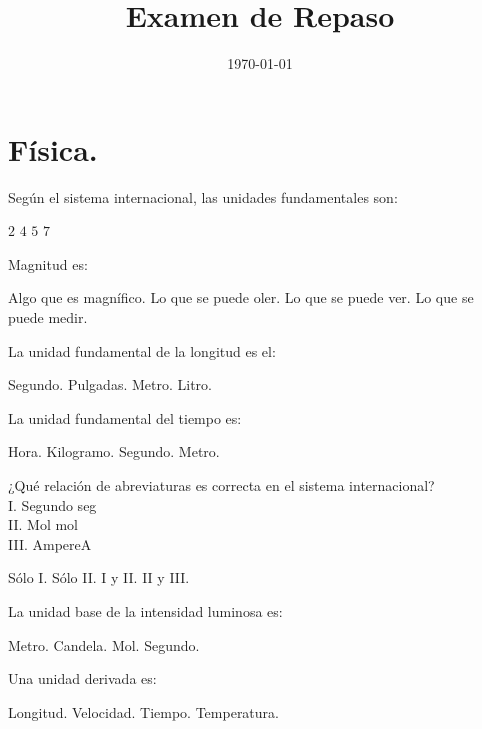 \documentclass[12pt]{exam}
\title{\vspace*{-2cm}Examen de Repaso\vspace{-5ex}}
\date{\today}
\begin{document}
\maketitle

\section{Física.}

\begin{questions}
    \question Según el sistema internacional, las unidades fundamentales son:
    \\[0.5em]
    \begin{oneparchoices}
        \choice $2$
        \choice $4$
        \choice $5$
        \choice $7$
    \end{oneparchoices}
    \question Magnitud es:
    \begin{choices}
        \choice Algo que es magnífico.
        \choice Lo que se puede oler.
        \choice Lo que se puede ver.
        \choice Lo que se puede medir.
    \end{choices}
    \question La unidad fundamental de la longitud es el:
    \\[0.5em]
    \begin{oneparchoices}
        \choice Segundo.
        \choice Pulgadas.
        \choice Metro.
        \choice Litro.
    \end{oneparchoices}
    \question La unidad fundamental del tiempo es:
    \\[0.5em]
    \begin{oneparchoices}
        \choice Hora.
        \choice Kilogramo.
        \choice Segundo.        
        \choice Metro.
    \end{oneparchoices}
    \question ¿Qué relación de abreviaturas es correcta en el sistema internacional?
    \\[0.5em]
    I. \quad Segundo \quad seg \\
    II. \quad Mol \quad mol \\
    III. \quad Ampere\quad A 
    \\[0.5em]
    \begin{oneparchoices}
        \choice Sólo I.
        \choice Sólo II.
        \choice I y II.
        \choice II y III.    
    \end{oneparchoices}
    \question La unidad base de la intensidad luminosa es:
    \\[0.5em]
    \begin{oneparchoices}
        \choice Metro.
        \choice Candela.
        \choice Mol.
        \choice Segundo.
    \end{oneparchoices}
    \question Una unidad derivada es:
    \\[0.5em]
    \begin{oneparchoices}
        \choice Longitud.
        \choice Velocidad.
        \choice Tiempo.
        \choice Temperatura.
    \end{oneparchoices}
\end{questions}
\end{document}
